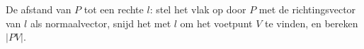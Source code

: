 \begin{werkwijze}
De afstand van $P$ tot een rechte $l$: stel het vlak op door $P$ met de richtingsvector van $l$ als normaalvector, snijd het met $l$ om het voetpunt $V$ te vinden, en bereken $|PV|$.
\end{werkwijze}

\begin{oefeningen}
\end{oefeningen}

\opdrachtenkop

\begin{oefeningen}


























\end{oefeningen}


